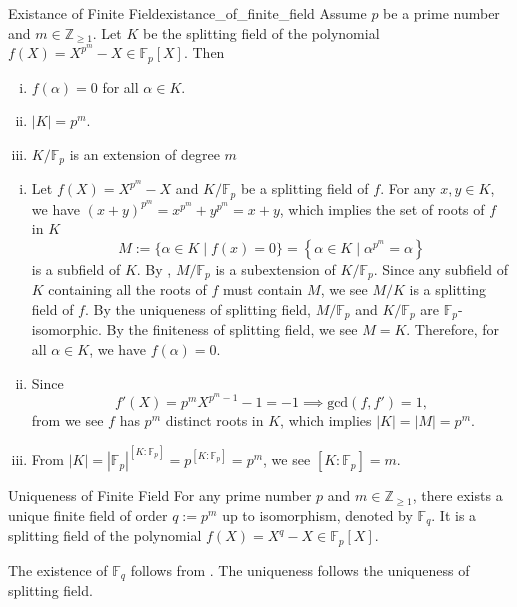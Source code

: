 \begin{lemma}{Existance of Finite Field}{existance_of_finite_field}
    Assume $p$ be a prime number and $m\in\mathbb{Z}_{\ge1}$. Let $K$ be the splitting field of the polynomial $f(X)=X^{p^m}-X\in \mathbb{F}_p[X]$. Then 
    \begin{enumerate}[(i)]
        \item $f(\alpha)=0$ for all $\alpha\in K$.
        \item $|K|=p^m$.
        \item $K/\mathbb{F}_p$ is an extension of degree $m$ 
        
    \end{enumerate}
\end{lemma}
\begin{prf}
    \begin{enumerate}[(i)]
        \item Let $f(X)=X^{p^m}-X$ and $K/\mathbb{F}_p$ be a splitting field of $f$. For any $x,y\in K$, we have $(x+y)^{p^m}=x^{p^m}+y^{p^m}=x+y$, which implies the set of roots of $f$ in $K$
        \[
        M:=\{\alpha\in K\mid f(x)=0\}=\left\{\alpha\in K\mid \alpha^{p^m}=\alpha\right\}
        \]
        is a subfield of $K$. By , $M/\mathbb{F}_p$ is a subextension of $K/\mathbb{F}_p$. Since any subfield of $K$ containing all the roots of $f$ must contain $M$, we see $M/K$ is a splitting field of $f$. By the uniqueness of splitting field, $M/\mathbb{F}_p$ and $K/\mathbb{F}_p$ are $\mathbb{F}_p$-isomorphic. By the finiteness of splitting field, we see $M=K$. Therefore, for all $\alpha\in K$, we have $f(\alpha)=0$.
        \item Since
        \[
        f'(X)=p^mX^{p^m-1}-1=-1\implies \mathrm{gcd}(f,f')=1,
        \]
        from  we see $f$ has $p^m$ distinct roots in $K$, which implies $|K|=|M|=p^m$. 
        \item From $|K|=|\mathbb{F}_p|^{[K:\mathbb{F}_p]}=p^{[K:\mathbb{F}_p]}=p^m$, we see $[K:\mathbb{F}_p]=m$.
    \end{enumerate}
  
\end{prf}

\begin{proposition}{Uniqueness of Finite Field}{}
For any prime number $p$ and $m\in\mathbb{Z}_{\ge1}$, there exists a unique finite field of order $q:=p^m$ up to isomorphism, denoted by $\mathbb{F}_{q}$. It is a splitting field of the polynomial $f(X)=X^{q}-X\in \mathbb{F}_p[X]$.
\end{proposition}
\begin{prf}
    The existence of $\mathbb{F}_{q}$ follows from . The uniqueness follows the uniqueness of splitting field.
\end{prf}



